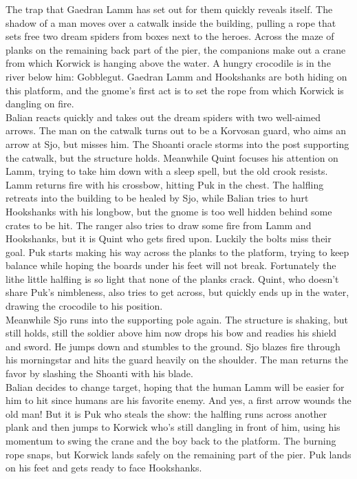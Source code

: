 The trap that Gaedran Lamm has set out for them quickly reveals itself. The shadow of a man moves over a catwalk inside the building, pulling a rope that sets free two dream spiders from boxes next to the heroes. Across the maze of planks on the remaining back part of the pier, the companions make out a crane from which Korwick is hanging above the water. A hungry crocodile is in the river below him: Gobblegut. Gaedran Lamm and Hookshanks are both hiding on this platform, and the gnome's first act is to set the rope from which Korwick is dangling on fire.\\

Balian reacts quickly and takes out the dream spiders with two well-aimed arrows. The man on the catwalk turns out to be a Korvosan guard, who aims an arrow at Sjo, but misses him. The Shoanti oracle storms into the post supporting the catwalk, but the structure holds. Meanwhile Quint focuses his attention on Lamm, trying to take him down with a sleep spell, but the old crook resists. Lamm returns fire with his crossbow, hitting Puk in the chest. The halfling retreats into the building to be healed by Sjo, while Balian tries to hurt Hookshanks with his longbow, but the gnome is too well hidden behind some crates to be hit. The ranger also tries to draw some fire from Lamm and Hookshanks, but it is Quint who gets fired upon. Luckily the bolts miss their goal. Puk starts making his way across the planks to the platform, trying to keep balance while hoping the boards under his feet will not break. Fortunately the lithe little halfling is so light that none of the planks crack. Quint, who doesn't share Puk's nimbleness, also tries to get across, but quickly ends up in the water, drawing the crocodile to his position.\\

Meanwhile Sjo runs into the supporting pole again. The structure is shaking, but still holds, still the soldier above him now drops his bow and readies his shield and sword. He jumps down and stumbles to the ground. Sjo blazes fire through his morningstar and hits the guard heavily on the shoulder. The man returns the favor by slashing the Shoanti with his blade.\\

Balian decides to change target, hoping that the human Lamm will be easier for him to hit since humans are his favorite enemy. And yes, a first arrow wounds the old man! But it is Puk who steals the show: the halfling runs across another plank and then jumps to Korwick who's still dangling in front of him, using his momentum to swing the crane and the boy back to the platform. The burning rope snaps, but Korwick lands safely on the remaining part of the pier. Puk lands on his feet and gets ready to face Hookshanks.\\

